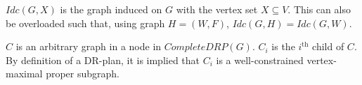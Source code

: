 $Idc(G,X)$ is the graph induced on $G$ with the vertex set $X\subseteq V$. This can also be overloaded such that, using graph $H=(W,F)$, $Idc(G,H)=Idc(G,W)$.

$C$ is an arbitrary graph in a node in $CompleteDRP(G)$. $C_i$ is the $i^{\text{th}}$ child of $C$. By definition of a DR-plan, it is implied that $C_i$ is a well-constrained vertex-maximal proper subgraph.
